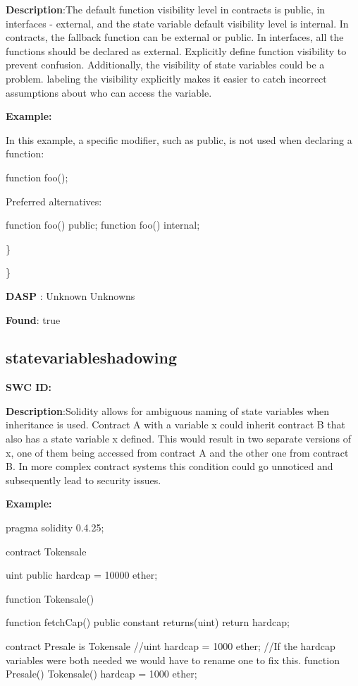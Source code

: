 \documentclass{article}
\begin{document}
\textbf{Description}:The default function visibility level in contracts is public, in interfaces - external,  and the state variable default visibility level is internal. In contracts, the fallback function can be external or public. In interfaces, all the functions should be declared as external. Explicitly define function visibility to prevent confusion.
Additionally, the visibility of state variables could be a problem. labeling the visibility explicitly makes it easier to catch incorrect assumptions about who can access the variable.


\textbf{Example:} 

In this example, a specific modifier, such as public, is not used when declaring a function:

function foo();

Preferred alternatives:

function foo() public;
function foo() internal;

\} 

\} 

\textbf{DASP} : Unknown Unknowns

\textbf{Found}: true

\subsection{state\textunderscore variable\textunderscore shadowing} 
\textbf{SWC \textunderscore ID:} 

\textbf{Description}:Solidity allows for ambiguous naming of state variables when inheritance is used. Contract A with a variable x could inherit contract B that also has a state variable x defined. This would result in two separate versions of x, one of them being accessed from contract A and the other one from contract B. In more complex contract systems this condition could go unnoticed and subsequently lead to security issues.


\textbf{Example:} 

pragma solidity 0.4.25;

contract Tokensale {
    uint public hardcap = 10000 ether;

    function Tokensale() {}

    function fetchCap() public constant returns(uint) {
        return hardcap;
    }
}

contract Presale is Tokensale {
    //uint hardcap = 1000 ether;
    //If the hardcap variables were both needed we would have to rename one to fix this.
    function Presale() Tokensale() {
        hardcap = 1000 ether;
    }
}
\end{document}
